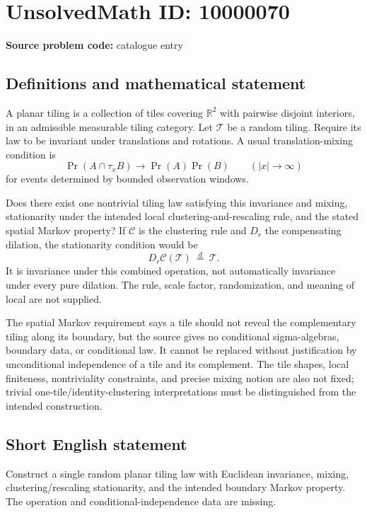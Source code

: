 \documentclass[11pt]{article}
\begin{document}
\section*{UnsolvedMath ID: 10000070}
\textbf{Source problem code:} catalogue entry
\subsection{Definitions and mathematical statement}
A planar tiling is a collection of tiles covering $\mathbb R^2$ with pairwise disjoint interiors, in an admissible measurable tiling category. Let $\mathcal T$ be a random tiling. Require its law to be invariant under translations and rotations. A usual translation-mixing condition is
\[
\Pr(A\cap\tau_x B)\longrightarrow\Pr(A)\Pr(B)
\qquad(|x|\to\infty)
\]
for events determined by bounded observation windows.

Does there exist one nontrivial tiling law satisfying this invariance and mixing, stationarity under the intended local clustering-and-rescaling rule, and the stated spatial Markov property? If $\mathcal C$ is the clustering rule and $D_r$ the compensating dilation, the stationarity condition would be
\[
D_r\mathcal C(\mathcal T)\ \stackrel{d}=\ \mathcal T.
\]
It is invariance under this combined operation, not automatically invariance under every pure dilation. The rule, scale factor, randomization, and meaning of local are not supplied.

The spatial Markov requirement says a tile should not reveal the complementary tiling along its boundary, but the source gives no conditional sigma-algebras, boundary data, or conditional law. It cannot be replaced without justification by unconditional independence of a tile and its complement. The tile shapes, local finiteness, nontriviality constraints, and precise mixing notion are also not fixed; trivial one-tile/identity-clustering interpretations must be distinguished from the intended construction.
\subsection{Short English statement}
Construct a single random planar tiling law with Euclidean invariance, mixing, clustering/rescaling stationarity, and the intended boundary Markov property. The operation and conditional-independence data are missing.
\end{document}
